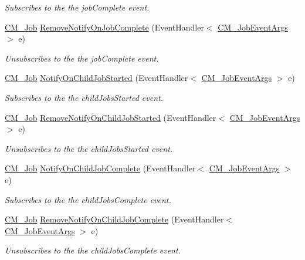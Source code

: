 \begin{DoxyCompactItemize}
\begin{DoxyCompactList}\small\item\em Subscribes to the the job\+Complete event. \end{DoxyCompactList}\item 
\hyperlink{class_c_m___job}{C\+M\+\_\+\+Job} \hyperlink{class_c_m___job_a66b44002e5fcff452842af8750826453}{Remove\+Notify\+On\+Job\+Complete} (Event\+Handler$<$ \hyperlink{class_c_m___job_event_args}{C\+M\+\_\+\+Job\+Event\+Args} $>$ e)
\begin{DoxyCompactList}\small\item\em Unsubscribes to the the job\+Complete event. \end{DoxyCompactList}\item 
\hyperlink{class_c_m___job}{C\+M\+\_\+\+Job} \hyperlink{class_c_m___job_aadeb872e3ab5b90139e0d728f869be6c}{Notify\+On\+Child\+Job\+Started} (Event\+Handler$<$ \hyperlink{class_c_m___job_event_args}{C\+M\+\_\+\+Job\+Event\+Args} $>$ e)
\begin{DoxyCompactList}\small\item\em Subscribes to the the child\+Jobs\+Started event. \end{DoxyCompactList}\item 
\hyperlink{class_c_m___job}{C\+M\+\_\+\+Job} \hyperlink{class_c_m___job_aa1841d0fe84126d85c11a31c7b87c1ab}{Remove\+Notify\+On\+Child\+Job\+Started} (Event\+Handler$<$ \hyperlink{class_c_m___job_event_args}{C\+M\+\_\+\+Job\+Event\+Args} $>$ e)
\begin{DoxyCompactList}\small\item\em Unsubscribes to the the child\+Jobs\+Started event. \end{DoxyCompactList}\item 
\hyperlink{class_c_m___job}{C\+M\+\_\+\+Job} \hyperlink{class_c_m___job_aebb453c205c9817d621bea62f1716ae0}{Notify\+On\+Child\+Job\+Complete} (Event\+Handler$<$ \hyperlink{class_c_m___job_event_args}{C\+M\+\_\+\+Job\+Event\+Args} $>$ e)
\begin{DoxyCompactList}\small\item\em Subscribes to the the child\+Jobs\+Complete event. \end{DoxyCompactList}\item 
\hyperlink{class_c_m___job}{C\+M\+\_\+\+Job} \hyperlink{class_c_m___job_ac84b366bd233ee5970fd9f5841195d8b}{Remove\+Notify\+On\+Child\+Job\+Complete} (Event\+Handler$<$ \hyperlink{class_c_m___job_event_args}{C\+M\+\_\+\+Job\+Event\+Args} $>$ e)
\begin{DoxyCompactList}\small\item\em Unsubscribes to the the child\+Jobs\+Complete event. \end{DoxyCompactList}\end{DoxyCompactItemize}
